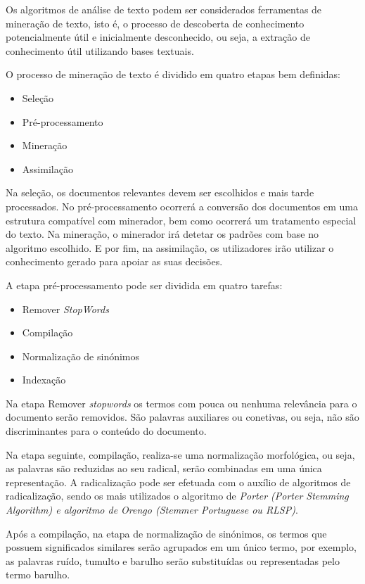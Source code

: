 Os algoritmos de análise de texto podem ser considerados ferramentas de mineração de texto, isto é, o processo de descoberta de conhecimento potencialmente útil e inicialmente desconhecido, ou seja, a extração de conhecimento útil utilizando bases textuais.

O processo de mineração de texto é dividido em quatro etapas bem definidas:
\begin{itemize}
  \item Seleção
  \item Pré-processamento
  \item Mineração
  \item Assimilação
\end{itemize}

Na seleção, os documentos relevantes devem ser escolhidos e mais tarde processados.
No pré-processamento ocorrerá a conversão dos documentos em uma estrutura compatível com minerador, bem como ocorrerá um tratamento especial do texto.
Na mineração, o minerador irá detetar os padrões com base no algoritmo escolhido.
E por fim, na assimilação, os utilizadores irão utilizar o conhecimento gerado para apoiar as suas decisões.

A etapa pré-processamento pode ser dividida em quatro tarefas:
\begin{itemize}
  \item Remover \textit{StopWords}
  \item Compilação
  \item Normalização de sinónimos
  \item Indexação
\end{itemize}

Na etapa Remover \textit{stopwords} os termos com pouca ou nenhuma relevância para o documento serão removidos.
São palavras auxiliares ou conetivas, ou seja, não são discriminantes para o conteúdo do documento.

Na etapa seguinte, compilação, realiza-se uma normalização morfológica, ou seja, as palavras são reduzidas ao seu radical, serão combinadas em uma única representação. A radicalização pode ser efetuada com o auxílio de algoritmos de radicalização, sendo os mais utilizados o algoritmo de \textit{Porter (Porter Stemming Algorithm) e algoritmo de Orengo (Stemmer Portuguese ou RLSP)}.

Após a compilação, na etapa de normalização de sinónimos, os termos que possuem significados similares serão agrupados em um único termo, por exemplo, as palavras ruído, tumulto e barulho serão substituídas ou representadas pelo termo barulho.

